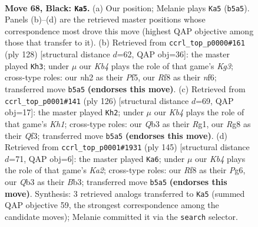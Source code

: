\documentclass[11pt]{article}
\begin{document}
\clearpage

\begin{figure}[p]\centering
\begin{subfigure}{0.46\textwidth}\centering
\resizebox{\linewidth}{!}{%
\newchessgame
\chessboard[
  setfen={5rr1/p5p1/3Q3p/1k1p3P/p2P2P1/1q2P3/6KN/4b3 b - - 45 68},
  showmover=false,
  pgfstyle=straightmove, color=movearrow, markmove={b5-a5}
]}
\caption{}
\end{subfigure}\hfill
\begin{subfigure}{0.46\textwidth}\centering
\resizebox{\linewidth}{!}{%
\newchessgame
\chessboard[
  setfen={3r3k/6p1/1p3nBp/1P2QP2/2q4P/5PK1/4R3/8 w - - 11 65},
  showmover=false,
  pgfstyle=straightmove, color=movearrow, markmove={g3-h3}
]}
\caption{}
\end{subfigure}
\\[4pt]
\begin{subfigure}{0.46\textwidth}\centering
\resizebox{\linewidth}{!}{%
\newchessgame
\chessboard[
  setfen={1knr4/1p6/1P2p3/p2p1p2/q4P2/1R3Q1P/8/6RK w - - 2 64},
  showmover=false,
  pgfstyle=straightmove, color=movearrow, markmove={h1-h2}
]}
\caption{}
\end{subfigure}\hfill
\begin{subfigure}{0.46\textwidth}\centering
\resizebox{\linewidth}{!}{%
\newchessgame
\chessboard[
  setfen={8/kr3p2/4p1p1/p1QpP3/P4P2/1b2P1K1/8/8 b - - 20 73},
  showmover=false,
  pgfstyle=straightmove, color=movearrow, markmove={a7-a6}
]}
\caption{}
\end{subfigure}
\caption{\textbf{Move 68, Black: \texttt{Ka5}.} (a) Our position; Melanie plays \texttt{Ka5} (\texttt{b5a5}). Panels (b)--(d) are the retrieved master positions whose correspondence most drove this move (highest QAP objective among those that transfer to it). (b) Retrieved from \texttt{ccrl\_top\_p0000\#161} (ply 128) [structural distance $d$=62, QAP obj=36]: the master played \texttt{Kh3}; under $\mu$ our \emph{Kb4} plays the role of that game's \emph{Kg3}; cross-type roles: our \emph{n}h2 as their \emph{P}f5, our \emph{R}f8 as their \emph{n}f6; transferred move \texttt{b5a5} \textbf{(endorses this move)}. (c) Retrieved from \texttt{ccrl\_top\_p0001\#141} (ply 126) [structural distance $d$=69, QAP obj=17]: the master played \texttt{Kh2}; under $\mu$ our \emph{Kb4} plays the role of that game's \emph{Kh1}; cross-type roles: our \emph{Q}b3 as their \emph{R}g1, our \emph{R}g8 as their \emph{Q}f3; transferred move \texttt{b5a5} \textbf{(endorses this move)}. (d) Retrieved from \texttt{ccrl\_top\_p0001\#1931} (ply 145) [structural distance $d$=71, QAP obj=6]: the master played \texttt{Ka6}; under $\mu$ our \emph{Kb4} plays the role of that game's \emph{Ka2}; cross-type roles: our \emph{R}f8 as their \emph{P}g6, our \emph{Q}b3 as their \emph{B}b3; transferred move \texttt{b5a5} \textbf{(endorses this move)}. Synthesis: 3 retrieved analogs transferred to \texttt{Ka5} (summed QAP objective 59, the strongest correspondence among the candidate moves); Melanie committed it via the \texttt{search} selector.}
\label{fig:thought-m135}
\end{figure}
\end{document}
